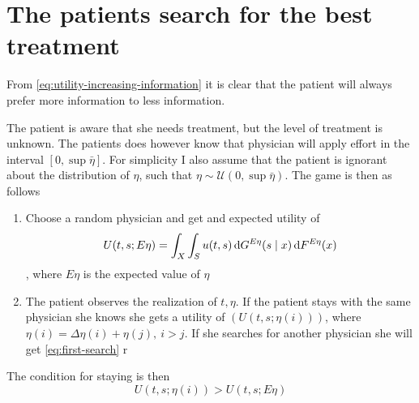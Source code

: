 \section{The patients search for the best treatment}

From \cref{eq:utility-increasing-information} it is clear that the patient will always prefer more information to less information. 

The patient is aware that she needs treatment, but the level of treatment is unknown. The patients does however know that physician will apply effort in the interval \([0,\sup\bar{\eta}]\). For simplicity I also assume that the patient is ignorant about the distribution of \(\eta\), such that \(\eta\sim \mathcal{U}(0,\sup\bar{\eta})\). The game is then as follows

\begin{enumerate}[label=\itshape Stage \arabic*:]
	\item Choose a random physician and get and expected utility of 
\begin{align}
    U(t,s;E\eta)=\int_{X}\int_{S}u(t,s)\dif G^{E\eta}(s\mid x)\dif F^{E\eta}(x)\label{eq:first-search}
\end{align},
	where \(E\eta\) is the expected value of \(\eta\)
	\item The patient observes the realization of \(t,\eta\). If the patient stays with the same physician she knows she gets a utility of \((U(t,s;\eta(i)))\), where \(\eta(i)=\Delta\eta(i)+\eta(j),\:i>j\). If she searches for another physician she will get \cref{eq:first-search}
	r
\end{enumerate}

The condition for staying is then 
\[
	U(t,s;\eta(i))>U(t,s;E\eta)
\]


\printbibliography

